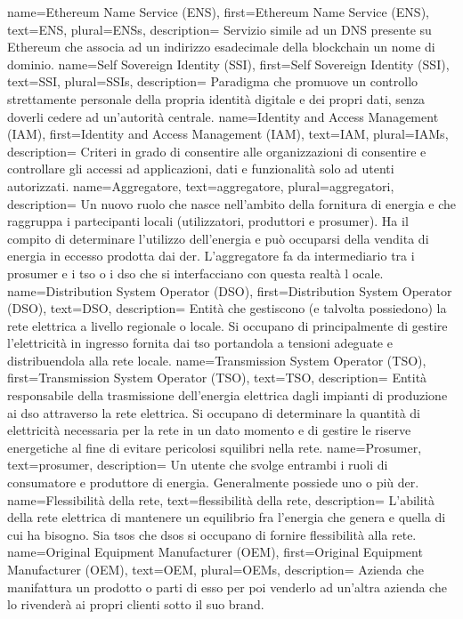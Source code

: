 {
    name={Ethereum Name Service (ENS)},
    first={Ethereum Name Service (ENS)},
    text={ENS},
    plural={ENSs},
    description={ 
        Servizio simile ad un DNS presente su Ethereum che associa ad un indirizzo esadecimale della blockchain un nome di dominio. 
    }
}
{
    name={Self Sovereign Identity (SSI)},
    first={Self Sovereign Identity (SSI)},
    text={SSI},
    plural={SSIs},
    description={ 
        Paradigma che promuove un controllo strettamente personale della propria identità digitale e dei propri dati, 
        senza doverli cedere ad un'autorità centrale. 
    }
}
{
    name={Identity and Access Management (IAM)},
    first={Identity and Access Management (IAM)},
    text={IAM},
    plural={IAMs},
    description={ 
        Criteri in grado di consentire alle organizzazioni di consentire e controllare gli accessi ad applicazioni, 
        dati e funzionalità solo ad utenti autorizzati. 
    }
}
{
    name={Aggregatore},
    text={aggregatore},
    plural={aggregatori},
    description={
        Un nuovo ruolo che nasce nell'ambito della fornitura di energia e che raggruppa i partecipanti locali (utilizzatori, produttori e \gls{prosumer}). Ha il compito di determinare l'utilizzo dell'energia e può occuparsi della vendita di energia in eccesso prodotta dai \gls{der}.
        L'aggregatore fa da intermediario tra i \gls{prosumer} e i \gls{tso} o i \gls{dso} che si interfacciano con questa realtà l ocale.
    }
}
{
    name={Distribution System Operator (DSO)},
    first={Distribution System Operator (DSO)},
    text={DSO},
    description={
        Entità che gestiscono (e talvolta possiedono) la rete elettrica a livello regionale o locale.
        Si occupano di principalmente di gestire l'elettricità in ingresso fornita dai \gls{tso} portandola a tensioni adeguate e distribuendola alla rete locale.
    }
}
{
    name={Transmission System Operator (TSO)},
    first={Transmission System Operator (TSO)},
    text={TSO},
    description={
        Entità responsabile della trasmissione dell'energia elettrica dagli impianti di produzione ai \gls{dso} attraverso la rete elettrica. 
        Si occupano di determinare la quantità di elettricità necessaria per la rete in un dato momento e di gestire le riserve energetiche al fine di evitare pericolosi squilibri nella rete.
    }
}
{
    name={Prosumer},
    text={prosumer},
    description={
        Un utente che svolge entrambi i ruoli di consumatore e produttore di energia. Generalmente possiede uno o più \gls{der}.
    }
}
{
    name={Flessibilità della rete},
    text={flessibilità della rete},
    description={
        L'abilità della rete elettrica di mantenere un equilibrio fra l'energia che genera e quella di cui ha bisogno.
        Sia \glspl{tso} che \glspl{dso} si occupano di fornire flessibilità alla rete.
    }
}
{
    name={Original Equipment Manufacturer (OEM)},
    first={Original Equipment Manufacturer (OEM)},
    text={OEM},
    plural={OEMs},
    description={
        Azienda che manifattura un prodotto o parti di esso per poi venderlo ad un'altra azienda che lo rivenderà ai propri clienti sotto il suo brand.
    }
}